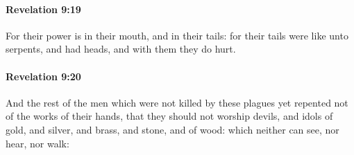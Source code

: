 		\paragraph{Revelation 9:19} %
			\label{REVELATIONNT-9-19}

			For their power is in their mouth, and in their tails: for their tails were like unto serpents, and had heads, and with them they do hurt.

			\begin{framed}
			\scriptsize
				\begin{compactdesc}
					\item[SBLG] 
				\end{compactdesc}
			\end{framed}

		\paragraph{Revelation 9:20} %
			\label{REVELATIONNT-9-20}

			And the rest of the men which were not killed by these plagues yet repented not of the works of their hands, that they should not worship devils, and idols of gold, and silver, and brass, and stone, and of wood: which neither can see, nor hear, nor walk:

